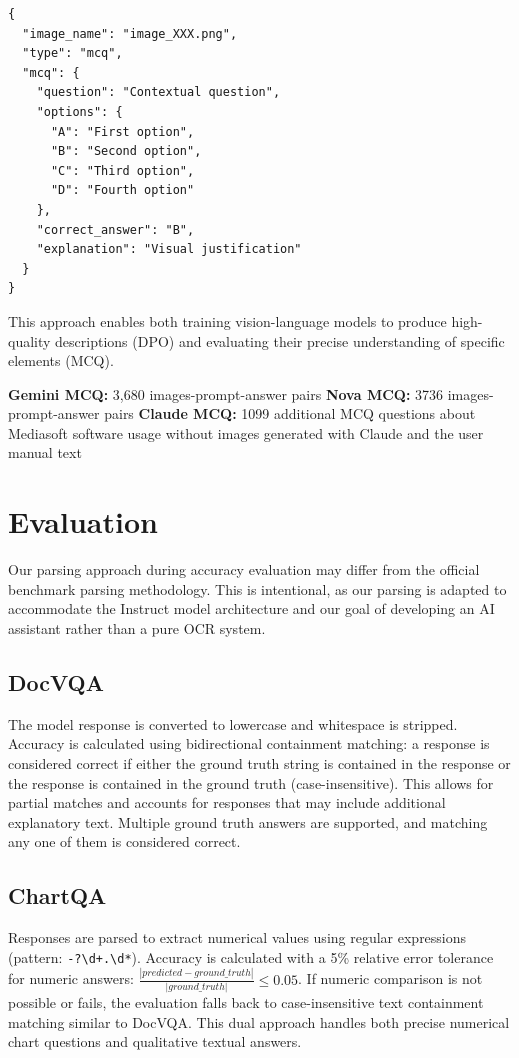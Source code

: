 \documentclass[10pt,conference,compsocconf]{IEEEtran}
\begin{document}
\begin{lstlisting}[caption={Structure of an MCQ entry}]
{
  "image_name": "image_XXX.png",
  "type": "mcq",
  "mcq": {
    "question": "Contextual question",
    "options": {
      "A": "First option",
      "B": "Second option",
      "C": "Third option",
      "D": "Fourth option"
    },
    "correct_answer": "B",
    "explanation": "Visual justification"
  }
}
\end{lstlisting}

This approach enables both training vision-language models to produce high-quality descriptions (DPO) and evaluating their precise understanding of specific elements (MCQ).

\textbf{Gemini MCQ:}  3,680 images-prompt-answer pairs 
\textbf{Nova MCQ:}  3736 images-prompt-answer pairs
\textbf{Claude MCQ:} 1099 additional MCQ questions about Mediasoft software usage without images generated with Claude and the user manual text

\section{Evaluation}

Our parsing approach during accuracy evaluation may differ from the official benchmark parsing methodology. This is intentional, as our parsing is adapted to accommodate the Instruct model architecture and our goal of developing an AI assistant rather than a pure OCR system.

\subsection*{DocVQA}
The model response is converted to lowercase and whitespace is stripped. Accuracy is calculated using bidirectional containment matching: a response is considered correct if either the ground truth string is contained in the response or the response is contained in the ground truth (case-insensitive). This allows for partial matches and accounts for responses that may include additional explanatory text. Multiple ground truth answers are supported, and matching any one of them is considered correct.

\subsection*{ChartQA}
Responses are parsed to extract numerical values using regular expressions (pattern: \texttt{-?\textbackslash d+.\textbackslash d*}). Accuracy is calculated with a 5\% relative error tolerance for numeric answers: $\frac{|predicted - ground\_truth|}{|ground\_truth|} \leq 0.05$. If numeric comparison is not possible or fails, the evaluation falls back to case-insensitive text containment matching similar to DocVQA. This dual approach handles both precise numerical chart questions and qualitative textual answers.
\end{document}
